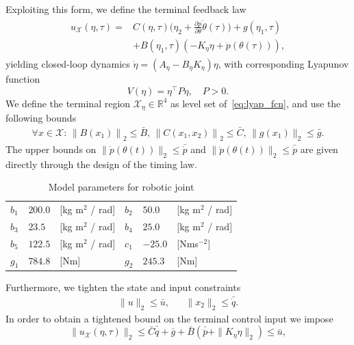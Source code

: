 \documentclass[journal]{IEEEtran}
\begin{document}
	Exploiting this form, we define the terminal feedback law
	\begin{align}\label{eq:u_xi}
	\begin{split}
	u_\mathcal{X}(\eta,\tau) = &C(\eta,\tau)\Big(\eta_2+ \frac{\partial{}p}{\partial\theta}\dot{\theta}(\tau)\Big)+g(\eta_1,\tau)\\
	&+B(\eta_1,\tau)(-K_\eta\eta+\ddot{p}(\theta(\tau))),
	\end{split}
	\end{align}
	yielding closed-loop dynamics $\dot{\eta}=(A_\eta-B_\eta{}K_\eta)\eta$, with corresponding Lyapunov function
	\begin{equation}
	\label{eq:lyap_fcn}
	V(\eta) = \eta^\top{}P\eta,\quad P > 0.
	\end{equation}
	We define the terminal region $\mathcal{X}_\eta\in\mathbb{R}^4$ as level set of~\eqref{eq:lyap_fcn}, and use the following bounds
	\begin{gather*}
	\forall x \in \mathcal{X}:\,\left \|B(x_1)\right \|_2\leq{}\bar{B},\, \left \|C(x_1,x_2)\right \|_2\leq{}\bar{C},\,\|g(x_1)\|_2\leq{}\bar{g}.
	\end{gather*}
	The upper bounds  on $\|\dot{p}(\theta(t))\|_2\leq{}\bar{\dot{p}}$ and $\|\ddot{p}(\theta(t))\|_2\leq\bar{\ddot{p}}$ are given directly through the design of the timing law.
	\begin{table} \caption{Model parameters for robotic joint}
		\centering
		\begin{tabular}{|lll||lll|}
			\hline
			$b_1$ &  $200.0$ & [kg m$^2$ / rad] & $b_2$ & $50.0$ 	& [kg m$^2$ / rad]\\
			$b_3$ &  $23.5$ & [kg m$^2$ / rad] & $b_4$ & $25.0$ 	& [kg m$^2$ / rad]\\
			$b_5$ &  $122.5$ & [kg m$^2$ / rad] & $c_1$ & $-25.0$ 	& [Nms$^{-2}$]\\
			$g_1$ & $784.8$ & [Nm] & $g_2$ & $245.3$ & [Nm]\\
			\hline
		\end{tabular}
		\label{tab:param}
	\end{table}
	Furthermore, we tighten the state and input constraints
	\begin{align*}
	\|u\|_2 \leq{} \bar{u},&& \|x_2\|_2\leq{}\bar{\dot{q}}.
	\end{align*}
	In order to obtain a tightened bound on the terminal control input we impose
	\begin{equation}
	\label{eq:robot_terminal_u_bound}
	\|u_\mathcal{X}(\eta,\tau)\|_2 \leq{} \bar{C}\bar{\dot{q}}+\bar{g}+\bar{B}(\bar{\ddot{p}}+\|K_\eta\eta\|_2)\leq{}\bar{u},
	\end{equation}
\end{document}
